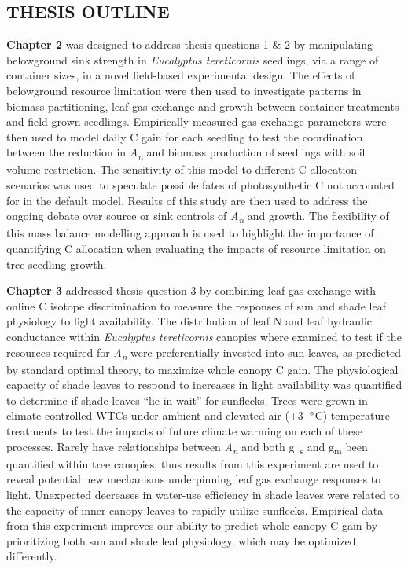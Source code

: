 \documentclass[a4paper]{article}\usepackage[]{graphicx}\usepackage[]{color}
\begin{document}
\subsection*{THESIS OUTLINE}

\textbf{Chapter 2} was designed to address thesis questions 1 \& 2 by manipulating belowground sink strength in \textit{Eucalyptus tereticornis} seedlings, via a range of container sizes, in a novel field-based experimental design. The effects of belowground resource limitation were then used to investigate patterns in biomass partitioning, leaf gas exchange and growth between container treatments and field grown seedlings. Empirically measured gas exchange parameters were then used to model daily C gain for each seedling to test the coordination between the reduction in \textit{A\textsubscript{n}} and biomass production of seedlings with soil volume restriction. The sensitivity of this model to different C allocation scenarios was used to speculate possible fates of photosynthetic C not accounted for in the default model. Results of this study are then used to address the ongoing debate over source or sink controls of \textit{A\textsubscript{n}} and growth. The flexibility of this mass balance modelling approach is used to highlight the importance of quantifying C allocation when evaluating the impacts of resource limitation on tree seedling growth.

\textbf{Chapter 3} addressed thesis question 3 by combining leaf gas exchange with online C isotope discrimination to measure the responses of sun and shade leaf physiology to light availability. The distribution of leaf N and leaf hydraulic conductance within \textit{Eucalyptus tereticornis} canopies where examined to test if the resources required for \textit{A\textsubscript{n}} were preferentially invested into sun leaves, as predicted by standard optimal theory, to maximize whole canopy C gain. The physiological capacity of shade leaves to respond to increases in light availability was quantified to determine if shade leaves “lie in wait” for sunflecks. Trees were grown in climate controlled WTCs under ambient and elevated air (+3~$\degree$C) temperature treatments to test the impacts of future climate warming on each of these processes. Rarely have relationships between \textit{A\textsubscript{n}} and both g~\textsubscript{s} and g\textsubscript{m} been quantified within tree canopies, thus results from this experiment are used to reveal potential new mechanisms underpinning leaf gas exchange responses to light. Unexpected decreases in water-use efficiency in shade leaves were related to the capacity of inner canopy leaves to rapidly utilize sunflecks. Empirical data from this experiment improves our ability to predict whole canopy C gain by prioritizing both sun and shade leaf physiology, which may be optimized differently.
\end{document}
